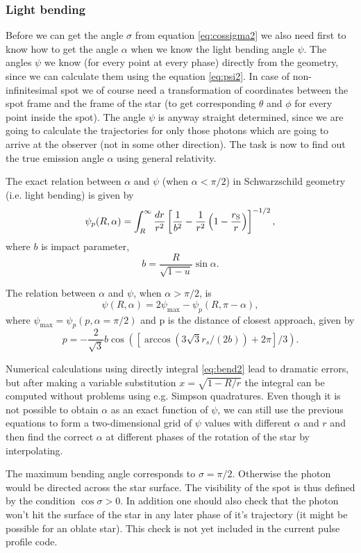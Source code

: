 \documentclass{wihuri}
\def\rg{r_{\rm S}} %
\def\be{\begin{equation}}
\def\ee{\end{equation}}
\def\rg{r_{\rm S}} %
\begin{document}
\subsubsection{Light bending}

Before we can get the angle $\sigma$ from equation \ref{eq:cossigma2} we also need first to know how to get the angle $\alpha$ when we know the light bending angle $\psi$. The angles $\psi$ we know (for every point at every phase) directly from the geometry, since we can calculate them using the equation \ref{eq:psi2}. In case of non-infinitesimal spot we of course need a  transformation of coordinates between the spot frame and the frame of the star (to get corresponding $\theta$ and $\phi$ for every point inside the spot). The angle $\psi$ is anyway straight determined, since we are going to calculate the trajectories for only those photons which are going to arrive at the observer (not in some other direction). The task is now to find out the true emission angle $\alpha$ using general relativity. 

The exact relation between $\alpha$ and $\psi$ (when $\alpha < \pi/2$) in Schwarzschild geometry (i.e. light bending) is given by \cite{mtw} %
\be \label{eq:bend2}
  \psi_{p}(R,\alpha)=\int_R^{\infty} \frac{dr}{r^2} \left[ \frac{1}{b^2} -
       \frac{1}{r^2}\left( 1- \frac{\rg}{r}\right)\right]^{-1/2} ,
\ee
where $b$ is impact parameter,
\be \label{eq:impact2}
  b=\frac{R}{\sqrt{1-u}} \sin\alpha .
\ee



The relation between  $\alpha$ and $\psi$, when $\alpha > \pi/2$, is 
\be 
\psi(R,\alpha)=2\psi_{\max}-\psi_{p}(R,\pi-\alpha),
\ee 
where $\psi_{\max} = \psi_{p}(p,\alpha=\pi/2)$ and p is the distance of closest approach, given by
\be
p = -\frac{2}{\sqrt{3}}b\cos([\arccos(3\sqrt{3}r_{s}/(2b))+2\pi]/3).
\ee


Numerical calculations using directly integral \ref{eq:bend2} lead to dramatic errors, but after making a variable substitution $x = \sqrt{1-R/r}$ the integral can be computed without problems using e.g. Simpson quadratures. Even though it is not possible to obtain $\alpha$ as an exact function of $\psi$, we can still use the previous equations to form a two-dimensional grid of $\psi$ values with different $\alpha$ and $r$ and then find the correct $\alpha$ at different phases of the rotation of the star by interpolating. 



The maximum bending angle corresponds to $\sigma=\pi/2$. Otherwise the photon would be directed across the star surface. 
The visibility of the spot is thus defined by the condition $\cos \sigma>0$. In addition one should also check that the photon won't hit the surface of the star in any later phase of it's trajectory (it might be possible for an oblate star). This check is not yet included in the current pulse profile code.
\end{document}
